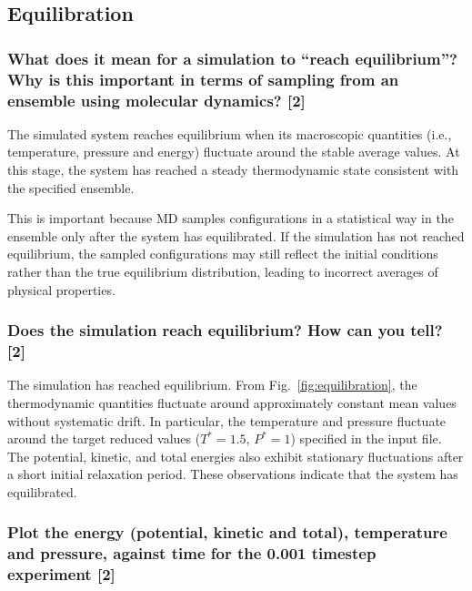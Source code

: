 \documentclass[a4paper,10pt,twocolumn]{article}
\begin{document}
\subsection{Equilibration}
\subsubsection*{What does it mean for a simulation to ``reach equilibrium''? Why is this important in terms of sampling from an ensemble using molecular dynamics? [2]}

The simulated system reaches equilibrium when its macroscopic quantities (i.e., temperature, pressure and energy) fluctuate around the stable average values. At this stage, the system has reached a steady thermodynamic state consistent with the specified ensemble.

This is important because MD samples configurations in a statistical way in the ensemble only after the system has equilibrated. If the simulation has not reached equilibrium, the sampled configurations may still reflect the initial conditions rather than the true equilibrium distribution, leading to incorrect averages of physical properties.


\subsubsection*{Does the simulation reach equilibrium? How can you tell? [2] }
The simulation has reached equilibrium. From Fig.~\ref{fig:equilibration}, the thermodynamic quantities fluctuate around approximately constant mean values without systematic drift. In particular, the temperature and pressure fluctuate around the target reduced values ($T^* = 1.5$, $P^* = 1$) specified in the input file. The potential, kinetic, and total energies also exhibit stationary fluctuations after a short initial relaxation period. These observations indicate that the system has equilibrated.

\subsubsection*{
Plot the energy (potential, kinetic and total), temperature and pressure, against time for the 0.001 timestep experiment [2] }
\end{document}
